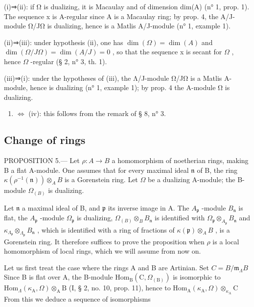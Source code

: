(i)⇒(ii): if Ω is dualizing, it is Macaulay and of dimension dim(A) (n° 1, prop. 1). The sequence x is A-regular since A is a Macaulay ring; by prop. 4, the A/J-module Ω/JΩ is dualizing, hence is a Matlis A/J-module (n° 1, example 1).

(ii)⇒(iii): under hypothesis (ii), one has \(\dim(\Omega)=\dim(A)\) and \(\dim(\Omega/J\Omega)=\dim(A/J)=0\) , so that the sequence x is secant for \(\Omega\) , hence \(\Omega\) -regular (§ 2, n° 3, th. 1).

(iii)⇒(i): under the hypotheses of (iii), the Λ/J-module Ω/JΩ is a Matlis A-module, hence is dualizing (n° 1, example 1); by prop. 4 the A-module Ω is dualizing.

\begin{enumerate}
\def\labelenumi{(\roman{enumi})}
\setcounter{enumi}{2}
\tightlist
\item
  \(\Leftrightarrow\) (iv): this follows from the remark of § 8, n° 3.
\end{enumerate}

\subsection{Change of rings}

PROPOSITION 5.--- Let \(\rho: A \to B\) a homomorphism of noetherian rings, making B a flat A-module. One assumes that for every maximal ideal \(\mathfrak{n}\) of B, the ring \(\kappa(\rho^{-1}(\mathfrak{n})) \otimes_{A} B\) is a Gorenstein ring. Let \(\Omega\) be a dualizing A-module; the B-module \(\Omega_{(B)}\) is dualizing.

Let \(\mathfrak{n}\) a maximal ideal of B, and \(\mathfrak{p}\) its inverse image in A. The \(A_{\mathfrak{p}}\) -module \(B_{\mathfrak{n}}\) is flat, the \(A_{\mathfrak{p}}\) -module \(\Omega_{\mathfrak{p}}\) is dualizing, \(\Omega_{(B)} \otimes_B B_{\mathfrak{n}}\) is identified with \(\Omega_{\mathfrak{p}} \otimes_{A_{\mathfrak{p}}} B_{\mathfrak{n}}\) and \(\kappa_{\Lambda_{\mathfrak{p}}} \otimes_{\Lambda_{\mathfrak{p}}} B_{\mathfrak{n}}\) , which is identified with a ring of fractions of \(\kappa(\mathfrak{p}) \otimes_A B\) , is a Gorenstein ring. It therefore suffices to prove the proposition when \(\rho\) is a local homomorphism of local rings, which we will assume from now on.

Let us first treat the case where the rings A and B are Artinian. Set \(C = B / \mathfrak{m}_{\Lambda}B\) Since B is flat over A, the B-module \(\mathrm{Hom}_{\mathrm{B}}(\mathrm{C},\Omega_{(\mathrm{B})})\) is isomorphic to \(\mathrm{Hom}_{\Lambda}(\kappa_{\mathrm{A}},\Omega)\otimes_{\mathrm{A}}\mathrm{B}\) (I, § 2, no. 10, prop. 11), hence to \(\mathrm{Hom}_{\mathrm{A}}(\kappa_{\mathrm{A}},\Omega)\otimes_{\kappa_{\mathrm{A}}}\mathrm{C}\) From this we deduce a sequence of isomorphisms


